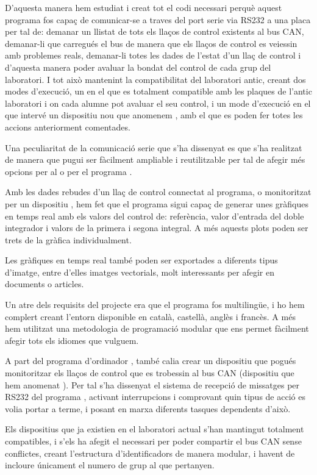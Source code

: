 D'aquesta manera hem estudiat i creat tot el codi necessari perquè aquest programa fos capaç de comunicar-se a traves del port serie via RS232 a una placa \FLEX per tal de: demanar un llistat de tots els llaços de control existents al bus CAN, demanar-li que carregués el bus de manera que els llaços de control es veiessin amb problemes reals, demanar-li totes les dades de l'estat d'un llaç de control i d'aquesta manera poder avaluar la bondat del control de cada grup del laboratori. I tot això mantenint la compatibilitat del laboratori antic, creant dos modes d'execució, un en el que es totalment compatible amb les plaques \FLEX de l'antic laboratori i on cada alumne pot avaluar el seu control, i un mode d'execució en el que intervé un dispositiu nou que anomenem \Monitor, amb el que es poden fer totes les accions anteriorment comentades.

Una peculiaritat de la comunicació serie que s'ha dissenyat es que s'ha realitzat de manera que pugui ser fàcilment ampliable i reutilitzable per tal de afegir més opcions per al \Monitor o per el programa \DCSMonitor.

Amb les dades rebudes d'un llaç de control connectat al programa, o monitoritzat per un dispositiu \Monitor, hem fet que el programa \DCSMonitor sigui capaç de generar unes gràfiques en temps real amb els valors del control de: referència, valor d'entrada del doble integrador i valors de la primera i segona integral. A més aquests plots poden ser trets de la gràfica individualment.

Les gràfiques en temps real també poden ser exportades a diferents tipus d'imatge, entre d'elles imatges vectorials, molt interessants per afegir en documents o articles.

Un atre dels requisits del projecte era que el programa fos multilingüe, i ho hem complert creant l'entorn disponible en català, castellà, anglès i francès. A més hem utilitzat una metodologia de programació modular que ens permet fàcilment afegir tots els idiomes que vulguem. 

A part del programa d'ordinador \DCSMonitor, també calia crear un dispositiu que pogués monitoritzar els llaços de control que es trobessin al bus CAN (dispositiu que hem anomenat \Monitor). Per tal s'ha dissenyat el sistema de recepció de missatges per RS232 del programa \DCSMonitor, activant interrupcions i comprovant quin tipus de acció es volia portar a terme, i posant en marxa diferents tasques dependents d'això.

Els dispositius que ja existien en el laboratori actual s'han mantingut totalment compatibles, i s'els ha afegit el necessari per poder compartir el bus CAN sense conflictes, creant l'estructura d'identificadors de manera modular, i havent de incloure únicament el numero de grup al que pertanyen.

